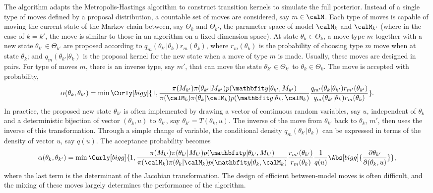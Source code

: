 The \rjmcmc algorithm adapts the Metropolis-Hastings algorithm to construct
transition kernels to simulate the full posterior. Instead of a single type
of moves defined by a proposal distribution, a countable set of moves are
considered, say $m\in\calM$. Each type of moves is capable of moving the
current state of the Markov chain between, say $\Theta_k$ and $\Theta_{k'}$,
the parameter space of model $\calM_k$ and $\calM_{k'}$ (where in the case of
$k = k'$, the move is similar to those in an \mcmc algorithm on a fixed
dimension space). At state $\theta_k\in\Theta_k$, a move type $m$ together
with a new state $\theta_{k'}\in\Theta_{k'}$ are proposed according to
$q_m(\theta_{k'}|\theta_k)r_m(\theta_k)$, where $r_m(\theta_k)$ is the
probability of choosing type $m$ move when at state $\theta_k$; and
$q_m(\theta_{k'}|\theta_k)$ is the proposal kernel for the new state when a
move of type $m$ is made. Usually, these moves are designed in pairs. For
type of moves $m$, there is an inverse type, say $m'$, that can move the
state $\theta_{k'}\in\Theta_{k'}$ to $\theta_k\in\Theta_k$. The move is
accepted with probability,
\begin{equation}
  \alpha(\theta_k,\theta_{k'}) =
  \min\Curly[bigg]{1,
    \frac{\pi(M_{k'})\pi(\theta_{k'}|M_{k'})p(\data|\theta_{k'},M_{k'})}
    {\pi(\calM_k)\pi(\theta_k|\calM_k)p(\data|\theta_k,\calM_k)}
    \frac{q_{m'}(\theta_k|\theta_{k'})r_{m'}(\theta_{k'})}
    {q_m(\theta_{k'}|\theta_k)r_m(\theta_k)}
  }.
\end{equation}
In practice, the proposed new state $\theta_{k'}$ is often implemented by
drawing a vector of continuous random variables, say $u$, independent of
$\theta_k$ and a deterministic bijection of vector $(\theta_k,u)$ to
$\theta_{k'}$, say $\theta_{k'} = T(\theta_k,u)$. The inverse of the move
from $\theta_{k'}$ back to $\theta_k$, $m'$, then uses the inverse of this
transformation. Through a simple change of variable, the conditional density
$q_m(\theta_{k'}|\theta_k)$ can be expressed in terms of the density of
vector $u$, say $q(u)$. The acceptance probability becomes
\begin{equation}
  \alpha(\theta_k,\theta_{k'}) =
  \min\Curly[bigg]{1,
    \frac{\pi(M_{k'})\pi(\theta_{k'}|M_{k'})p(\data|\theta_{k'},M_{k'})}
    {\pi(\calM_k)\pi(\theta_k|\calM_k)p(\data|\theta_k,\calM_k)}
    \frac{r_{m'}(\theta_{k'})}{r_m(\theta_k)}
    \frac{1}{q(u)}\Abs[bigg]{\frac{\partial\theta_{k'}}{\partial(\theta_k,u)}}
  },
\end{equation}
where the last term is the determinant of the Jacobian transformation. The
design of efficient between-model moves is often difficult, and the mixing of
these moves largely determines the performance of the algorithm.

